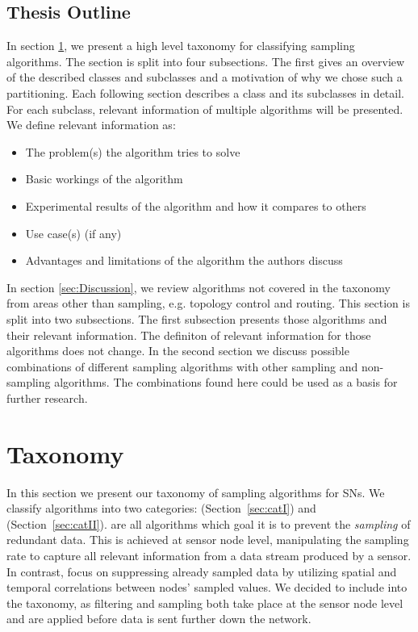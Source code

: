 \subsection{Thesis Outline}

  In section \ref{sec:Taxonomy}, we present a
high level taxonomy for classifying sampling algorithms. The section is split
into four subsections. The first gives an overview of the described classes and
subclasses and a motivation of why we chose such a partitioning. Each following
section describes a class and its subclasses in detail. For each subclass,
relevant information of multiple algorithms will be presented. We define
relevant information as:
\begin{itemize}
	\item The problem(s) the algorithm tries to solve
	\item Basic workings of the algorithm
	\item Experimental results of the algorithm and how it compares to others
	\item Use case(s) (if any)
	\item Advantages and limitations of the algorithm the authors discuss
\end{itemize}

 In section \ref{sec:Discussion}, we review
algorithms not covered in the taxonomy from areas other than sampling, e.g.
topology control and routing. This section is split into two subsections. The
first subsection presents those algorithms and their relevant information. The
definiton of relevant information for those algorithms does not change. In the
second section we discuss possible combinations of different sampling
algorithms with other sampling and non-sampling algorithms. The combinations
found here could be used as a basis for further research.


\section{Taxonomy}
\label{sec:Taxonomy}

In this section we present our taxonomy of sampling algorithms for \acp{SN}. We
classify algorithms into two categories: \catI (Section~\ref{sec:catI}) and
\catII (Section~\ref{sec:catII}). %
\catI are all algorithms which goal it is to prevent the \textit{sampling}
of redundant data. This is achieved at sensor node level, manipulating the
sampling rate to capture all relevant information from a data stream produced
by a sensor. In contrast, \catII focus on suppressing already sampled data by
utilizing spatial and temporal correlations between nodes' sampled values. We
decided to include \catII into the taxonomy, as filtering and sampling both
take place at the sensor node level and are applied before data is sent further
down the network.  %


